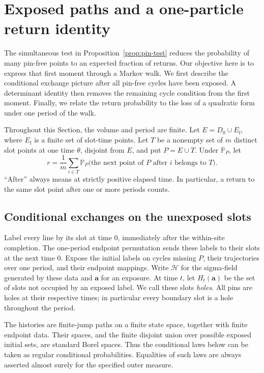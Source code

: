 \section{Exposed paths and a one-particle return identity}
\label{sec:exposure}

The simultaneous test in Proposition~\ref{prop:pin-test} reduces the
probability of many pin-free points to an expected fraction of returns.
Our objective here is to express that first moment through a Markov walk.
We first describe the conditional exchange picture after all pin-free
cycles have been exposed.  A determinant identity then removes the
remaining cycle condition from the first moment.  Finally, we relate the
return probability to the loss of a quadratic form under one period of
the walk.

Throughout this Section, the volume and period are finite.  Let
\(E=D_0\cup E_{\mathrm f}\), where \(E_{\mathrm f}\) is a finite set of
slot-time points.  Let \(T\) be a nonempty set of \(m\) distinct slot points
at one time \(\theta\), disjoint from \(E\), and put \(P=E\cup T\).
Under \(\mathbb P_P\), let
\begin{equation}
 r=\frac1m\sum_{i\in T}
 \mathbb P_P\bigl(\text{the next point of }P\text{ after }i
                         \text{ belongs to }T\bigr).
 \label{eq:exposure-r}
\end{equation}
``After'' always means at strictly positive elapsed time.  In particular,
a return to the same slot point after one or more periods counts.

\subsection{Conditional exchanges on the unexposed slots}

Label every line by its slot at time \(0\), immediately after the
within-site completion.  The one-period endpoint permutation sends these
labels to their slots at the next time \(0\).  Expose the initial labels
on cycles missing \(P\), their trajectories over one period, and their
endpoint mappings.  Write \(\mathcal H\) for the sigma-field generated by
these data and \(\mathbf a\) for an exposure.  At time \(t\), let
\(H_t(\mathbf a)\) be the set of slots not occupied by an exposed label.
We call these slots \emph{holes}.  All pins are holes at their respective
times; in particular every boundary slot is a hole throughout the
period.

The histories are finite-jump paths on a finite state space, together
with finite endpoint data.  Their spaces, and the finite disjoint union
over possible exposed initial sets, are standard Borel spaces.  Thus the
conditional laws below can be taken as regular conditional probabilities.
Equalities of such laws are always asserted almost surely for the
specified outer measure.

